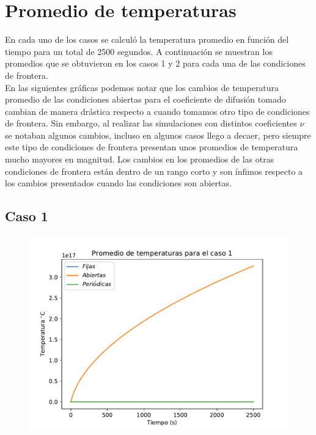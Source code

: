 \documentclass[12pt,letterpaper]{article}
\begin{document}
\section*{Promedio de temperaturas}

En cada uno de los casos se calculó la temperatura promedio en función del tiempo para un total de 2500 segundos. A continuación se muestran los promedios que se obtuvieron en los casos 1 y 2 para cada una de las condiciones de frontera.\\

En las siguientes gráficas podemos notar que los cambios de temperatura promedio de las condiciones abiertas para el coeficiente de difusión tomado cambian de manera drástica respecto a cuando tomamos otro tipo de condiciones de frontera. Sin embargo, al realizar las simulaciones con distintos coeficientes $\nu$ se notaban algunos cambios, incluso en algunos casos llego a decaer, pero siempre este tipo de condiciones de frontera presentan unos promedios de temperatura mucho mayores en magnitud. Los cambios en los promedios de las otras condiciones de frontera están dentro de un rango corto y son ínfimos respecto a los cambios presentados cuando las condiciones son abiertas.

\subsection*{Caso 1}

\begin{figure}[H]
\includegraphics{prom1.pdf}
\centering
\end{figure}
\end{document}
